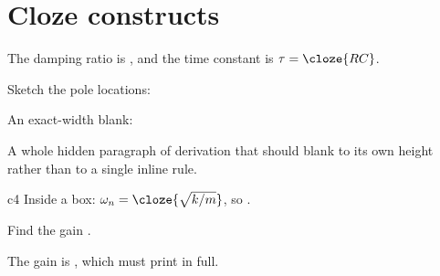 \section{Cloze constructs}
\label{cloze-constructs}

The damping ratio is , and the time constant is $\tau = \cloze{RC}$.

Sketch the pole locations: \clozeblank{10em}

An exact-width blank: \clozeblank{4cm}


\begin{clozeblock}
A whole hidden paragraph of derivation that should blank to its own
height rather than to a single inline rule.
\end{clozeblock}

\begin{myexample}[]{}{c4}
\noindent Inside a box: $\omega_n = \cloze{\sqrt{k/m}}$, so \clozeblank{5em}.

\end{myexample}

\begin{exercise}[ID=8y,hash=8y]
\label{8y}
Find the gain .
\end{exercise}
\begin{solution}
The gain is , which must print in full.
\end{solution}
